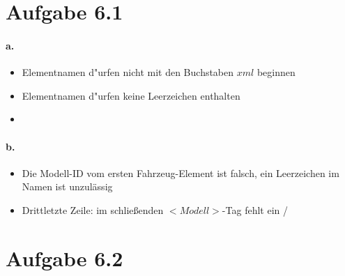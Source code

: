 \documentclass{scrartcl}
\begin{document}
	
	

	
	\section*{Aufgabe 6.1}
		\paragraph*{a.}
			\begin{itemize}
				\item Elementnamen d"urfen nicht mit den Buchstaben $ xml $ beginnen
				\item Elementnamen d"urfen keine Leerzeichen enthalten
				\item 
			\end{itemize}
		
		\paragraph*{b.}
			\begin{itemize}
				\item Die Modell-ID vom ersten Fahrzeug-Element ist falsch, ein Leerzeichen im Namen ist unzulässig
				\item Drittletzte Zeile: im schließenden $ <Modell> $-Tag fehlt ein /	
			\end{itemize}
	
	\section*{Aufgabe 6.2}
		
\end{document}
